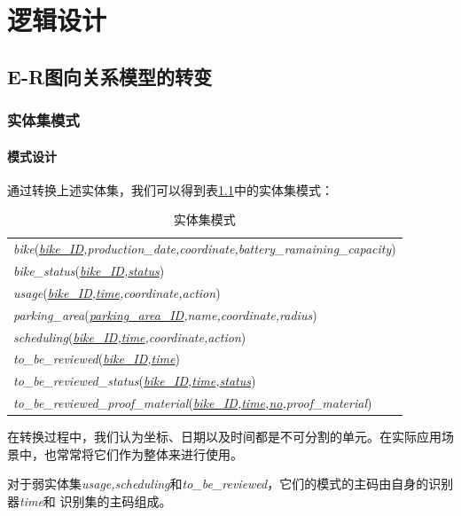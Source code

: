\chapter{逻辑设计}
\thispagestyle{empty}
\section{E-R图向关系模型的转变}
\subsection{实体集模式}
\subsubsection{模式设计}
通过转换上述实体集，我们可以得到表\ref{tab:entityschema}中的实体集模式：
\begin{table}[!hpt]
    \caption{实体集模式}
    \label{tab:entityschema}
    \centering
    \begin{tabular}{l} \toprule
         \textit{bike}(\textit{\underline{bike\_ID},production\_date,coordinate,battery\_ramaining\_capacity})\\
         \textit{bike\_status}(\textit{\underline{bike\_ID},\underline{status}})\\
         \textit{usage}(\textit{\underline{bike\_ID},\underline{time},coordinate,action})\\
         \textit{parking\_area}(\textit{\underline{parking\_area\_ID},name,coordinate,radius})\\
         \textit{scheduling}(\textit{\underline{bike\_ID},\underline{time},coordinate,action})\\
         \textit{to\_be\_reviewed}(\textit{\underline{bike\_ID},\underline{time}})\\
         \textit{to\_be\_reviewed\_status}(\textit{\underline{bike\_ID},\underline{time},\underline{status}})\\
         \textit{to\_be\_reviewed\_proof\_material}(\textit{\underline{bike\_ID},\underline{time},\underline{no},proof\_material})\\\bottomrule
    \end{tabular}
  \end{table}

  在转换过程中，我们认为坐标、日期以及时间都是不可分割的单元。在实际应用场景中，也常常将它们作为整体来进行使用。

  对于弱实体集\textit{usage,scheduling}和\textit{to\_be\_reviewed}，它们的模式的主码由自身的识别器\textit{time}和
  识别集的主码组成。


